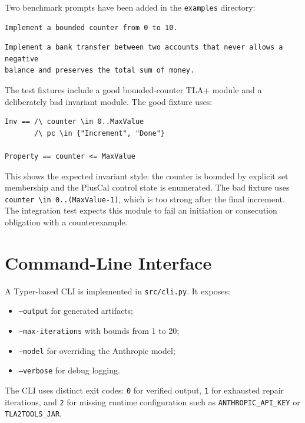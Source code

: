 \documentclass[11pt]{article}
\begin{document}
Two benchmark prompts have been added in the \texttt{examples} directory:

\begin{lstlisting}
Implement a bounded counter from 0 to 10.
\end{lstlisting}

\begin{lstlisting}
Implement a bank transfer between two accounts that never allows a negative
balance and preserves the total sum of money.
\end{lstlisting}

The test fixtures include a good bounded-counter TLA+ module and a deliberately
bad invariant module. The good fixture uses:

\begin{lstlisting}
Inv == /\ counter \in 0..MaxValue
       /\ pc \in {"Increment", "Done"}

Property == counter <= MaxValue
\end{lstlisting}

This shows the expected invariant style: the counter is bounded by explicit set
membership and the PlusCal control state is enumerated. The bad fixture uses
\texttt{counter \textbackslash in 0..(MaxValue-1)}, which is too strong after
the final increment. The integration test expects this module to fail an
initiation or consecution obligation with a counterexample.

\section{Command-Line Interface}

A Typer-based CLI is implemented in \texttt{src/cli.py}. It exposes:

\begin{itemize}
  \item \texttt{--output} for generated artifacts;
  \item \texttt{--max-iterations} with bounds from 1 to 20;
  \item \texttt{--model} for overriding the Anthropic model;
  \item \texttt{--verbose} for debug logging.
\end{itemize}

The CLI uses distinct exit codes: \texttt{0} for verified output, \texttt{1}
for exhausted repair iterations, and \texttt{2} for missing runtime
configuration such as \texttt{ANTHROPIC\_API\_KEY} or \texttt{TLA2TOOLS\_JAR}.
\end{document}
